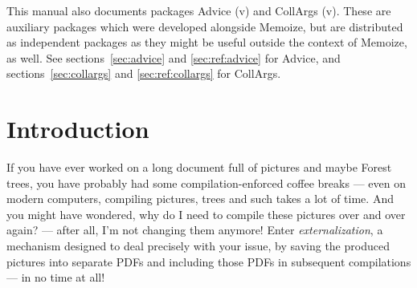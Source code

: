 \documentclass[a4paper,11pt]{article}
\begin{document}
\vfill

\begin{tcolorbox}[colback=emphcolor, fontupper=\footnotesize]
  This manual also documents packages Advice
  ({v\packagever}) and CollArgs
  ({v\packagever}).  These are auxiliary
  packages which were developed alongside Memoize, but are distributed as
  independent packages as they might be useful outside the context of Memoize,
  as well.  See sections~\ref{sec:advice} and \ref{sec:ref:advice} for Advice, and
  sections~\ref{sec:collargs} and \ref{sec:ref:collargs} for CollArgs.
\end{tcolorbox}
\endgroup



\section*{Introduction}
\label{sec:intro}

\begin{tcolorbox}[
    title={\introboxtitle{What} is externalization and why you might want it?},
  ]
  If you have ever worked on a long document full of \TikZ pictures and maybe
  Forest trees, you have probably had some compilation-enforced coffee breaks
  --- even on modern computers, compiling pictures, trees and such takes a lot
  of time.  And you might have wondered, why do I need to compile these
  pictures over and over again? --- after all, I'm not changing them anymore!
  Enter \emph{externalization}, a mechanism designed to deal precisely with
  your issue, by saving the produced pictures into separate PDFs and including
  those PDFs in subsequent compilations --- in no time at all!
\end{tcolorbox}
\end{document}
